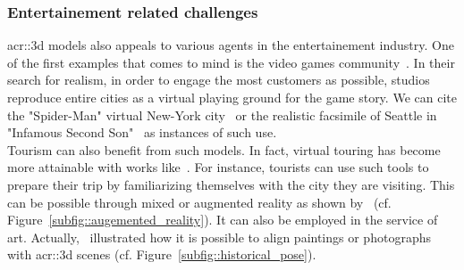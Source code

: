         \subsubsection{Entertainement related challenges}
            \gls{acr::3d} models also appeals to various agents in the entertainement industry.
            One of the first examples that comes to mind is the video games community~\parencite{watson2008procedural}.
            In their search for realism, in order to engage the most customers as possible, studios reproduce entire cities as a virtual playing ground for the game story.
            We can cite the "Spider-Man" virtual New-York city~\parencite{gilbert2018i,plante2013how} or the realistic facsimile of Seattle in "Infamous Second Son"~\parencite{mcwhertor2013under} as instances of such use.\\
            Tourism can also benefit from such models.
            In fact, virtual touring has become more attainable with works like~\textcite{koutsoudis20073d}.
            For instance, tourists can use such tools to prepare their trip by familiarizing themselves with the city they are visiting.
            This can be possible through mixed or augmented reality as shown by~\textcite{devaux20183d} (cf. Figure~\ref{subfig::augemented_reality}).
            It can also be employed in the service of art.
            Actually,~\textcite{russell2011automatic,aubry2014painting} illustrated how it is possible to align paintings or photographs with \gls{acr::3d} scenes (cf. Figure~\ref{subfig::historical_pose}).\\

